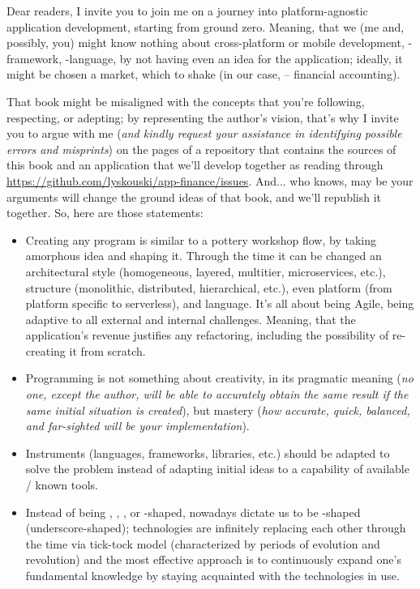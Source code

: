 

Dear readers, I invite you to join me on a journey into platform-agnostic application development, starting from ground 
zero. Meaning, that we (me and, possibly, you) might know nothing about cross-platform or mobile development, 
-framework, -language, by not having even an idea for the application; ideally, it might 
be chosen a market, which to shake (in our case, -- financial accounting).

That book might be misaligned with the concepts that you're following, respecting, or adepting; by representing the 
author's vision, that's why I invite you to argue with me (\emph{and kindly request your assistance in identifying 
possible errors and misprints}) on the pages of a repository that contains the sources of this book and an application 
that we'll develop together as reading through 
\href{https://github.com/lyskouski/app-finance/issues}{https://github.com/lyskouski/app-finance/issues}. And... 
who knows, may be your arguments will change the ground ideas of that book, and we'll republish it together. 
So, here are those statements:

\begin{itemize}
    \item Creating any program is similar to a pottery workshop flow, by taking amorphous idea and shaping it. Through 
    the time it can be changed an architectural style (homogeneous, layered, multitier, microservices, etc.), structure 
    (monolithic, distributed, hierarchical, etc.), even platform (from platform specific to serverless), and language. 
    It's all about being Agile, being adaptive to all external and internal challenges. Meaning, that the application's 
    revenue justifies any refactoring, including the possibility of re-creating it from scratch.

    \item Programming is not something about creativity, in its pragmatic meaning (\emph{no one, except the author, 
    will be able to accurately obtain the same result if the same initial situation is created}), but mastery 
    (\emph{how accurate, quick, balanced, and far-sighted will be your implementation}).

    \item Instruments (languages, frameworks, libraries, etc.) should be adapted to solve the problem instead of 
    adapting initial ideas to a capability of available / known tools.

    \item Instead of being , , , or -shaped, nowadays dictate us to be \q{\_}-shaped 
    (underscore-shaped); technologies are infinitely replacing each other through the time via tick-tock model 
    (characterized by periods of evolution and revolution) and the most effective approach is to continuously expand 
    one's fundamental knowledge by staying acquainted with the technologies in use.
\end{itemize}

